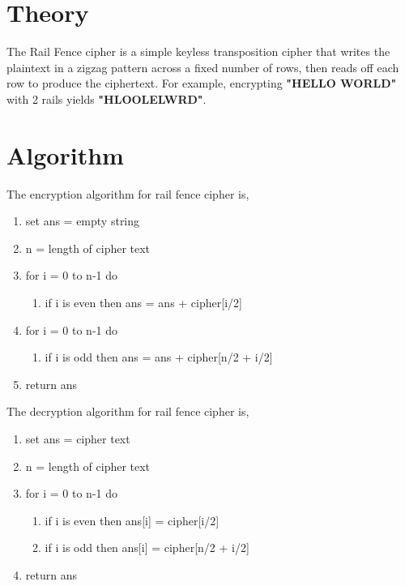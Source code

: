 
\section{Theory}
The Rail Fence cipher is a simple keyless transposition cipher that writes the plaintext in a zigzag pattern across a fixed number of rows, then reads off each row to produce the ciphertext. For example, encrypting \textbf{"HELLO WORLD"} with 2 rails yields \textbf{"HLOOLELWRD"}.

\section{Algorithm}
The encryption algorithm for rail fence cipher is,
\begin{enumerate}
  \item set ans = empty string
  \item n = length of cipher text
  \item for i = 0 to n-1 do
  \begin{enumerate}
    \item if i is even then ans = ans + cipher[i/2]
  \end{enumerate}
  \item for i = 0 to n-1 do
  \begin{enumerate}
    \item if i is odd then ans = ans + cipher[n/2 + i/2]
  \end{enumerate}
  \item return ans
\end{enumerate}
The decryption algorithm for rail fence cipher is,
\begin{enumerate}
  \item set ans = cipher text
  \item n = length of cipher text
  \item for i = 0 to n-1 do
  \begin{enumerate}
    \item if i is even then ans[i] = cipher[i/2]
    \item if i is odd then ans[i] = cipher[n/2 + i/2]
  \end{enumerate}
  \item return ans
\end{enumerate}


